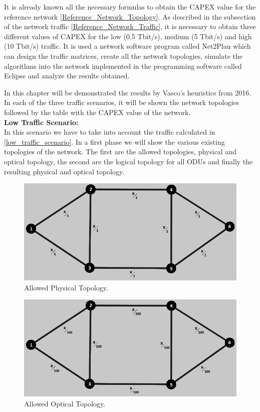 It is already known all the necessary formulas to obtain the CAPEX value for the reference network \ref{Reference_Network_Topology}. As described in the subsection of the network traffic \ref{Reference_Network_Traffic}, it is necessary to obtain three different values of CAPEX for the low (0.5 Tbit/s), medium (5 Tbit/s) and high (10 Tbit/s) traffic. It is used a network software program called Net2Plan which can design the traffic matrices, create all the network topologies, simulate the algorithms into the network implemented in the programming software called Eclipse and analyze the results obtained.

In this chapter will be demonstrated the results by Vasco's heuristics from 2016. In each of the three traffic scenarios, it will be shown the network topologies followed by the table with the CAPEX value of the network.\\

\textbf{Low Traffic Scenario:}\\

In this scenario we have to take into account the traffic calculated in \ref{low_traffic_scenario}. In a first phase we will show the various existing topologies of the network. The first are the allowed topologies, physical and optical topology, the second are the logical topology for all ODUs and finally the resulting physical and optical topology.\\

\begin{figure}[H]
\centering
\includegraphics[width=13cm]{sdf/heuristic/figures/topologies/opaque_protec/low/allowed_physical_low}
\caption{Allowed Physical Topology.}
\label{allowed_physical_protec_ref_low_heuristic}
\end{figure}

\begin{figure}[H]
\centering
\includegraphics[width=13cm]{sdf/heuristic/figures/topologies/opaque_protec/low/allowed_optical_low}
\caption{Allowed Optical Topology.}
\label{allowed_optical_protec_ref_low_heuristic}
\end{figure}

